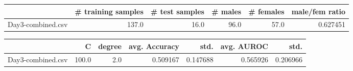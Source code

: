 \begin{tabular}{lrrrrr}
\hline
{} &  \# training samples &  \# test samples &  \# males &  \# females &  male/fem ratio \\
\hline
Day3-combined.csv &               137.0 &            16.0 &     96.0 &       57.0 &        0.627451 \\
\hline
\end{tabular}
\begin{tabular}{lrrrrrr}
\hline
{} &      C &  degree &  avg. Accuracy &      std. &  avg. AUROC &      std. \\
\hline
Day3-combined.csv &  100.0 &     2.0 &       0.509167 &  0.147688 &    0.565926 &  0.206966 \\
\hline
\end{tabular}
